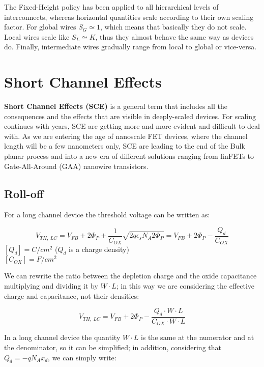 \documentclass[a4paper, 12pt, twoside, openright]{report}
\begin{document}
The Fixed-Height policy has been applied to all hierarchical levels of interconnects, whereas horizontal quantities scale according to their own scaling factor. For global wires $S_{G} \simeq 1$, which means that basically they do not scale. Local wires scale like $S_{L} \simeq K$, thus they almost behave the same way as devices do. Finally, intermediate wires gradually range from local to global or vice-versa.

\section{Short Channel Effects}

\textbf{Short Channel Effects (SCE)} is a general term that includes all the consequences and the effects that are visible in deeply-scaled devices. For scaling continues with years, SCE are getting more and more evident and difficult to deal with. As we are entering the age of nanoscale FET devices, where the channel length will be a few nanometers only, SCE are leading to the end of the Bulk planar process and into a new era of different solutions ranging from finFETs to Gate-All-Around (GAA) nanowire transistors. 

\subsection{Roll-off} \label{subsec:roll_off}


For a long channel device the threshold voltage can be written as:

	\begin{equation}
	V_{TH,\ LC} = V_{FB} + 2\Phi_P + \frac{1}{C_{OX}} \sqrt{2q \epsilon_s N_A 2 \Phi_P} = V_{FB} + 2\Phi_P - \frac{Q_d}{C_{OX}}
	\end{equation}
	$[Q_{d}] = C/cm^2$ ($Q_{d}$ is a charge density)\\
	$[C_{OX}] = F/cm^2$

We can rewrite the ratio between the depletion charge and the oxide capacitance multiplying and dividing it by $W \cdot L$; in this way we are considering the effective charge and capacitance, not their densities:

	\begin{equation}
	V_{TH,\ LC} = V_{FB} + 2\Phi_P - \frac{Q_d \cdot W \cdot L}{C_{OX} \cdot W \cdot L}
	\end{equation}

In a long channel device the quantity $W \cdot L$ is the same at the numerator and at the denominator, so it can be simplified; in addition, considering that $Q_d = -q N_A x_d$, we can simply write:
\end{document}
